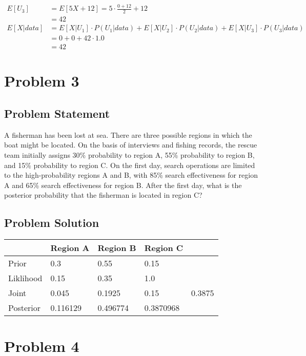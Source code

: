 \documentclass[12pt]{article}
\theoremstyle{definition}
\begin{document}
\begin{align*}
E[U_3] &= E[5X + 12] = 5 \cdot \frac{0 + 12}{2} + 12\\
&= 42\\
E[X|data] &= E[X|U_1]\cdot P(U_1|data) + E[X|U_2]\cdot P(U_2|data) + E[X|U_3]\cdot P(U_3|data)\\
&= 0 + 0 + 42 \cdot 1.0 \\
&= 42
\end{align*}


\newpage
\section*{Problem 3}


\subsection*{Problem Statement}

A fisherman has been lost at sea. There are three possible regions in which the boat might be located. On the basis of interviews and fishing records, the rescue team initially assigns 30\% probability to region A, 55\% probability to region B, and 15\% probability to region C. On the first day, search operations are limited to the high-probability regions A and B, with 85\% search effectiveness for region A and 65\% search effectiveness for region B. After the first day, what is the posterior probability that the fisherman is located in region C?

\subsection*{Problem Solution}
\begin{tabular}{lllll}
          & Region A   & Region B  & Region C  &           \\
\hline
Prior     & 0.3        & 0.55      & 0.15      &           \\
Liklihood & 0.15       & 0.35      & 1.0       &           \\
Joint     & 0.045      & 0.1925    & 0.15      & 0.3875    \\
Posterior & 0.116129   & 0.496774  & 0.3870968 &           \\
\hline
\end{tabular}


\newpage
\section*{Problem 4}
\end{document}
